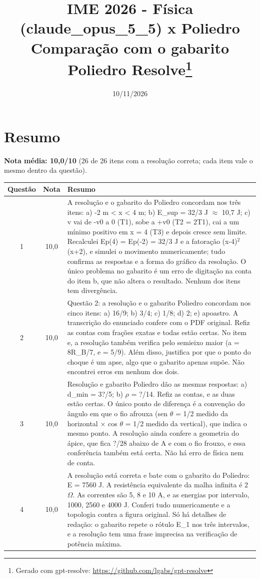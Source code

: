 \documentclass{article}%
\title{IME 2026 {-} Física (claude\_opus\_5\_5) x Poliedro\\[4pt]\large Comparação com o gabarito Poliedro Resolve\thanks{Gerado com gpt-resolve: \url{https://github.com/lgabs/gpt-resolve}}}%
\date{10/11/2026}%
\begin{document}
%
\normalsize%
\maketitle%
\section*{Resumo}\textbf{Nota média: 10,0/10} (26 de 26 itens com a resolução correta; cada item vale o mesmo dentro da questão).\par\medskip%
\begin{longtable}{@{}c c p{}@{}}\toprule Questão & Nota & Resumo \\ \midrule
1 & 10,0 & A resolução e o gabarito do Poliedro concordam nos três itens: a) -2 m < x < 4 m; b) E\_sup = 32/3 J $\approx$ 10,7 J; c) v vai de -v0 a 0 (T1), sobe a +v0 (T2 = 2T1), cai a um mínimo positivo em x = 4 (T3) e depois cresce sem limite. Recalculei Ep(4) = Ep(-2) = 32/3 J e a fatoração (x-4)$^2$(x+2), e simulei o movimento numericamente; tudo confirma as respostas e a forma do gráfico da resolução. O único problema no gabarito é um erro de digitação na conta do item b, que não altera o resultado. Nenhum dos itens tem divergência. \\
2 & 10,0 & Questão 2: a resolução e o gabarito Poliedro concordam nos cinco itens: a) 16/9; b) 3/4; c) 1/8; d) 2; e) apoastro. A transcrição do enunciado confere com o PDF original. Refiz as contas com frações exatas e todas estão certas. No item e, a resolução também verifica pelo semieixo maior (a = 8R\_B/7, e = 5/9). Além disso, justifica por que o ponto do choque é um apse, algo que o gabarito apenas supõe. Não encontrei erros em nenhum dos dois. \\
3 & 10,0 & Resolução e gabarito Poliedro dão as mesmas respostas: a) d\_min = 3?/5; b) $\rho$ = ?/14. Refiz as contas, e as duas estão certas. O único ponto de diferença é a convenção do ângulo em que o fio afrouxa (sen $\theta$ = 1/2 medido da horizontal $\times$ cos $\theta$ = 1/2 medido da vertical), que indica o mesmo ponto. A resolução ainda confere a geometria do ápice, que fica ?/28 abaixo de A e com o fio frouxo, e essa conferência também está certa. Não há erro de física nem de conta. \\
4 & 10,0 & A resolução está correta e bate com o gabarito do Poliedro: E = 7560 J. A resistência equivalente da malha infinita é 2 $\Omega$. As correntes são 5, 8 e 10 A, e as energias por intervalo, 1000, 2560 e 4000 J. Conferi tudo numericamente e a topologia contra a figura original. Só há detalhes de redação: o gabarito repete o rótulo E\_1 nos três intervalos, e a resolução tem uma frase imprecisa na verificação de potência máxima. \\

\end{longtable}
\end{document}
